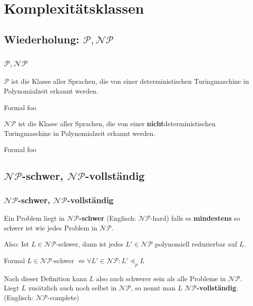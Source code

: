 




\section{Komplexitätsklassen}
\subsection{Wiederholung: $\mathcal{P}, \mathcal{NP}$}
\begin{frame}
	\frametitle{$\mathcal{P}, \mathcal{NP}$}
	
	$\mathcal{P}$ ist die Klasse aller Sprachen, die von einer deterministischen Turingmaschine in Polynomialzeit erkannt werden.
	\begin{block}{Formal}
		foo
	\end{block}
	
	$\mathcal{NP}$ ist die Klasse aller Sprachen, die von einer \textbf{nicht}deterministischen Turingmaschine in Polynomialzeit erkannt werden.
	\begin{block}{Formal}
		foo
	\end{block}
\end{frame}

\subsection{$\mathcal{NP}$-schwer, $\mathcal{NP}$-vollständig}
\begin{frame}
	\frametitle{$\mathcal{NP}$-schwer, $\mathcal{NP}$-vollständig}
	Ein Problem liegt in \textbf{$\mathcal{NP}$-schwer} (Englisch: $\mathcal{NP}$-hard) falls es \textbf{mindestens} so schwer ist wie jedes Problem in $\mathcal{NP}$.
	
	Also: Ist $L \in \mathcal{NP}$-schwer, dann ist jedes $L' \in \mathcal{NP}$ polynomiell reduzierbar auf $L$.
	
	\begin{block}{Formal}
		$L \in \mathcal{NP}$-schwer $\Leftrightarrow \forall L' \in \mathcal{NP}: L' \preceq_p L$
	\end{block}
	
	Nach dieser Definition kann $L$ also auch schwerer sein als alle Probleme in $\mathcal{NP}$. Liegt $L$ zusätzlich auch noch selbst in $\mathcal{NP}$, so nennt man $L$ \textbf{$\mathcal{NP}$-vollständig}. (Englisch: $\mathcal{NP}$-complete)
\end{frame}

